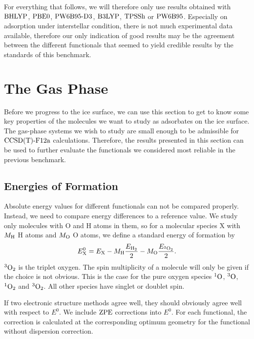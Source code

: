 For everything that follows, we will therefore only use results obtained
with $\text{BHLYP}$, $\text{PBE0}$, $\text{PW6B95}\text{-D3}$, $\text{B3LYP}$, $\text{TPSSh}$ or $\text{PW6B95}$. Especially on
adsorption under interstellar condition, there is not much experimental
data available, therefore our only indication of good results may be
the agreement between the different functionals that seemed to yield credible
results by the standards of this benchmark.
  
\section{The Gas Phase}
\label{Sec:Gas}

Before we progress to the ice surface, we can use this section
to get to know some key properties of the molecules we want to
study as adsorbates on the ice surface. The gas-phase systems
we wish to study are small enough to be admissible for $\text{CCSD(T)-F12a}$
calculations. Therefore, the results presented in this section can
be used to further evaluate the functionals we considered most
reliable in the previous benchmark.

\subsection{Energies of Formation}
\label{Sec:Gas:Energy}
Absolute energy values for different functionals can not be compared
properly. Instead, we need to compare energy differences to
a reference value. We study only molecules with O and H atoms
in them, so for a molecular species X with $M_{\text{H}}$ H atoms and 
$M_{\text O}$ O atoms, we define a standard energy of formation
by
\begin{equation}
E^0_{\text X}=E_{\text X} - M_{\text H} \frac {E_{\text H_2}} 2 - M_{\text O} \frac {E_{{^3\text O_2}}} 2.
\label{Gas:FormationEnergy} 
\end{equation}
${^3\text O_2}$ is the triplet oxygen. The spin multiplicity of a molecule will
only be given if the choice is not obvious. This is the case for the
pure oxygen species ${^1\text{O}}$, ${^3\text{O}}$, ${^1\text O_2}$ and ${^3\text O_2}$. All other
species have singlet or doublet spin.

If two electronic
structure methods agree well, they should obviously agree well with respect to
$E^0$.
We include $\text{ZPE}$ corrections into $E^0$. For each functional, 
the correction is calculated at the corresponding optimum geometry
for the functional without dispersion correction. 

